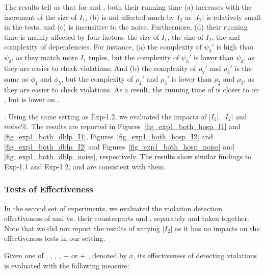 The results tell us that for \CINDs and \pCINDs, both their running time (a) increases with the increment of the size of $I_1$, (b) is not affected much by $I_2$ as $|I_2|$ is relatively small in the tests, and (c) is insensitive to the noise. Furthermore, (d) their running time is mainly affected by four factors: the size of $I_1$, the size of $I_2$, the \LHS and \RHS complexity of dependencies.
For instance, (a) the \LHS complexity of \CIND $\psi_3'$ is high than \pCFD $\psi_3$, as they match more $I_1$ tuples, but
the \RHS complexity of \CIND $\psi_3'$ is lower than \pCIND $\psi_3$, as they are easier to check violations; And
(b) the \LHS complexity of \CINDs $\rho_2'$ and $\rho_3'$ is the same as  \pCFDs $\phi_4$ and $\phi_5$, but
 the \RHS complexity of \CINDs $\rho_2'$ and $\rho_3'$ is lower than \pCINDs $\rho_2$ and $\rho_3$, as they are easier to check violations.
As a result, the running time of \CINDs is closer to \pCFDs on \hosp, but is lower on \dblp. 

.
Using the same setting as {Exp-1.2}, we evaluated the impacts of $|I_1|$, $|I_2|$ and $noise\%$. The results are reported in Figures~\ref{fig_exp1_both_hosp_I1} and \ref{fig_exp1_both_dblp_I1}, Figures~\ref{fig_exp1_both_hosp_I2} and \ref{fig_exp1_both_dblp_I2} and Figures~\ref{fig_exp1_both_hosp_noise} and \ref{fig_exp1_both_dblp_noise}, respectively. The results show similar findings to {Exp-1.1} and {Exp-1.2}, and are consistent with them.



\vspace{-1ex}
\subsubsection{Tests of Effectiveness}


In the second set of experiments, we evaluated the violation detection effectiveness of  \pCFDs and \pCINDs vs. their counterparts \CFDs and \CINDs, separately and taken together. Note that we did not report the results of varying $|I_{2}|$ as it has no impacts on the effectiveness tests in our setting.


Given one of \CFDs, \pCFDs, \CINDs, \pCINDs,  \CFDs + \CINDs or \pCFDs + \pCINDs, denoted by $x$, its effectiveness of detecting violations is evaluated with the following measure:

\vspace{0ex}




